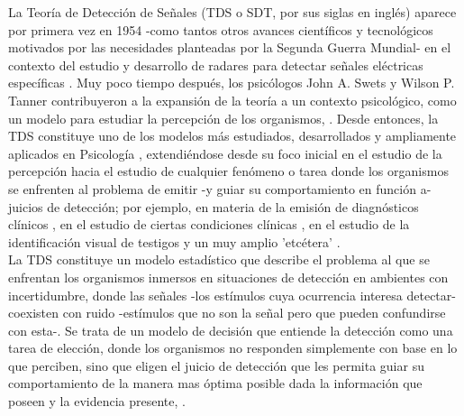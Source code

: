 La Teoría de Detección de Señales (TDS o SDT, por sus siglas en inglés) aparece por primera vez en 1954 -como tantos otros avances científicos y tecnológicos motivados por las necesidades planteadas por la Segunda Guerra Mundial- en el contexto del estudio y desarrollo de radares para detectar señales eléctricas específicas \parencite{Peterson1954}. Muy poco tiempo después, los psicólogos John A. Swets y Wilson P. Tanner contribuyeron a la expansión de la teoría a un contexto psicológico, como un modelo para estudiar la percepción de los organismos, \parencite{Tanner1954, Swets1961}. Desde entonces, la TDS constituye uno de los modelos más estudiados, desarrollados y ampliamente aplicados en Psicología \parencite{Stainslaw1999}, extendiéndose desde su foco inicial en el estudio de la percepción \parencite{Rosenholtz2001, Pessoa2005, Wallis2007} hacia el estudio de cualquier fenómeno o tarea donde los organismos se enfrenten al problema de emitir -y guiar su comportamiento en función a- juicios de detección; por ejemplo, en materia de la emisión de diagnósticos clínicos \parencite{Grossberg1978, Swets2000, Boutis2010}, en el estudio de ciertas condiciones clínicas \parencite{Westermann2010, Bonnel2003, Brown1994, Naliboff1981}, en el estudio de la identificación visual de testigos \parencite{Gronlund2014, Wixted2014, Wixted2016} y un muy amplio 'etcétera' \parencite{Gordon1974, Nuechterlein1983, Harvey1992, Verghese2001}.\\ 

La TDS constituye un modelo estadístico que describe el problema al que se enfrentan los organismos inmersos en situaciones de detección en ambientes con incertidumbre, donde las señales -los estímulos cuya ocurrencia interesa detectar- coexisten con ruido -estímulos que no son la señal pero que pueden confundirse con esta-. Se trata de un modelo de decisión que entiende la detección como una tarea de elección, donde los organismos no responden simplemente con base en lo que perciben, sino que eligen el juicio de detección que les permita guiar su comportamiento de la manera mas óptima posible dada la información que poseen y la evidencia presente, \parencite{Swets2000, Killeen2014}.\\


